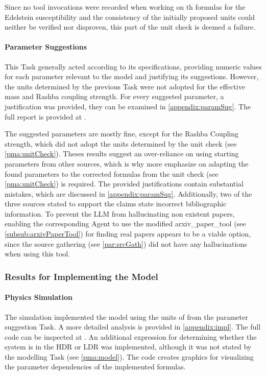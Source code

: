 \documentclass[
	fontsize = 11pt,
	paper = a4,
	draft = false,
	twoside = true,
	titlepage = false
]{scrartcl}
\numberwithin{equation}{subsection}
\begin{document}
	Since no tool invocations were recorded when working on th formulas for the Edelstein susceptibility and the consistency of the initially proposed units could neither be verified nor disproven, this part of the unit check is deemed a failure.
	
	\paragraph{Parameter Suggestions} \label{pma:par}
	This Task generally acted according to its specifications, providing numeric values for each parameter relevant to the model and justifying its suggestions. However, the units determined by the previous Task were not adopted for the effective mass and Rashba coupling strength. For every suggested parameter, a justification was provided, they can be examined in \autoref{appendix:paramSug}. The full report is provided at \autocite{gitParams}.
	
	The suggested parameters are mostly fine, except for the Rashba Coupling strength, which did not adopt the units determined by the unit check (see \autoref{pma:unitCheck}). Theses results suggest an over-reliance on using starting parameters from other sources, which is why more emphasize on adapting the found parameters to the corrected formulas from the unit check (see \autoref{pma:unitCheck}) is required. The provided justifications contain substantial mistakes, which are discussed in \autoref{appendix:paramSug}. Additionally, two of the three sources stated to support the claims state incorrect bibliographic information. To prevent the \gls{LLM} from hallucinating non existent papers, enabling the corresponding \gls{Agent} to use the modified arxiv\_paper\_tool (see \autoref{subsub:arxivPaperTool}) for finding real papers appears to be a viable option, since the source gathering (see \autoref{par:srcGath}) did not have any hallucinations when using this tool.

	\subsubsection{Results for Implementing the Model} \label{results:imple}
	\paragraph{Physics Simulation} \label{pma:sim}
	The simulation implemented the model using the units of from the parameter suggestion Task. A more detailed analysis is provided in \autoref{appendix:impl}. The full code can be inspected at \autocite{gitImp}. An additional expression for determining whether the system is in the HDR or LDR was implemented, although it was not stated by the modelling Task (see \autoref{pma:model}). The code creates graphics for visualizing the parameter dependencies of the implemented formulas.
	
\end{document}
